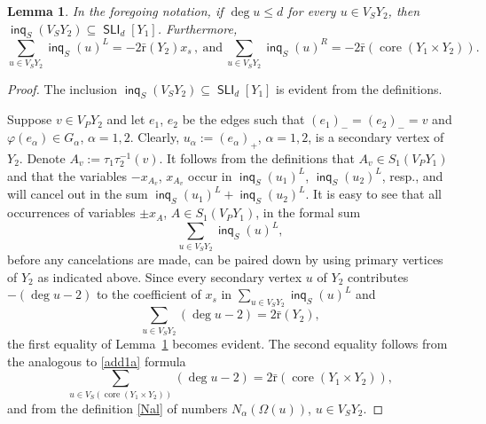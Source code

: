 \documentclass[10pt, reqno]{amsart}
\numberwithin{equation}{section}
\newtheorem{lem}[thm]{Lemma}
\begin{document}
\begin{lem}\label{lem1}
  In the foregoing notation, if $\deg u \le d$ for every $u \in V_S Y_2$, then $\operatorname{\textsf{inq}}_S(V_S Y_2) \subseteq  \operatorname{\textsf{SLI}}_d[Y_1]$. Furthermore,
 \begin{equation*}\label{inc2}
\sum_{u \in V_S Y_2}  \operatorname{\textsf{inq}}_S(u)^L = -2 {\bar {\mathrm{r}}} (Y_2) x_s  \, ,   \ \mbox{and}  \
\sum_{u \in  V_S Y_2}  \operatorname{\textsf{inq}}_S(u)^R = -2 {\bar {\mathrm{r}}} ( \operatorname{core}(Y_1 \times  Y_2) )   .
\end{equation*}
\end{lem}

\begin{proof}  The inclusion  $\operatorname{\textsf{inq}}_S(V_S Y_2) \subseteq  \operatorname{\textsf{SLI}}_d[Y_1]$   is evident from the definitions.

Suppose $v \in V_P Y_2$ and  let
$e_1$, $e_2$ be the edges such that
$(e_1)_- =  (e_2)_- =  v$  and  ${\varphi}(e_{\alpha})  \in G_{\alpha}$, ${\alpha} =1,2$.
Clearly, $u_{\alpha} := (e_{\alpha})_+$, ${\alpha} =1,2$, is a secondary vertex of $Y_2$.     Denote $A_v := \tau_1 \tau_2^{-1}(v)$. It follows from the definitions that  $A_v \in S_1( V_P Y_1)$ and that the variables   $-x_{A_v}$, $x_{A_v}$  occur in
$\operatorname{\textsf{inq}}_S(u_1)^L$, $\operatorname{\textsf{inq}}_S(u_2)^L$, resp., and will cancel out in the sum $\operatorname{\textsf{inq}}_S(u_1)^L + \operatorname{\textsf{inq}}_S(u_2)^L$. It is easy to see that  all occurrences of variables $\pm x_A$, $A \in S_1( V_P Y_1)$, in the formal sum
$$
\sum_{u \in V_S Y_2 } \operatorname{\textsf{inq}}_S(u)^L ,
$$
before any cancelations are made, can be  paired down by using primary vertices  of $Y_2$ as indicated above.  Since every secondary vertex $u$ of $Y_2$  contributes $-(\deg u -2)$ to the coefficient of $x_s$ in $\sum_{u \in V_S Y_2 } \operatorname{\textsf{inq}}_S(u)^L$ and
\begin{equation}\label{add1a}
\sum_{u \in V_S Y_2}  (\deg u -2) = 2 {\bar {\mathrm{r}}} (Y_2)  ,
\end{equation}
the first equality of Lemma~\ref{lem1} becomes evident.  The second equality follows from
the analogous to \eqref{add1a} formula
\begin{equation*}
\sum_{u \in V_S (\operatorname{core}(Y_1 \times  Y_2))}  (\deg u -2) = 2{\bar {\mathrm{r}}} (\operatorname{core}(Y_1 \times  Y_2)) ,
\end{equation*}
and from the definition \eqref{Nal} of numbers $N_{\alpha}(\Omega(u))$, $u \in V_S Y_2$.
\end{proof}
\end{document}
